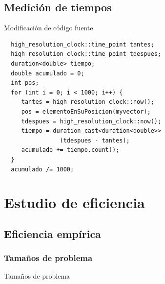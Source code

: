 \documentclass{beamer}
\begin{document}
\subsection{Medición de tiempos}

\begin{frame}[fragile]{Modificación de código fuente}
\begin{verbatim}
  high_resolution_clock::time_point tantes;
  high_resolution_clock::time_point tdespues;
  duration<double> tiempo;
  double acumulado = 0;
  int pos;
  for (int i = 0; i < 1000; i++) {
	 tantes = high_resolution_clock::now();
	 pos = elementoEnSuPosicion(myvector);
	 tdespues = high_resolution_clock::now();
	 tiempo = duration_cast<duration<double>>
	 	        (tdespues - tantes);
	 acumulado += tiempo.count();
  }
  acumulado /= 1000;
\end{verbatim}
\end{frame}




\section{Estudio de eficiencia}

\subsection{Eficiencia empírica}

\subsubsection{Tamaños de problema}

\begin{frame}[fragile]{Tamaños de problema}
\begin{table}[H]
\centering
{}
\end{table}
\end{frame}
\end{document}
